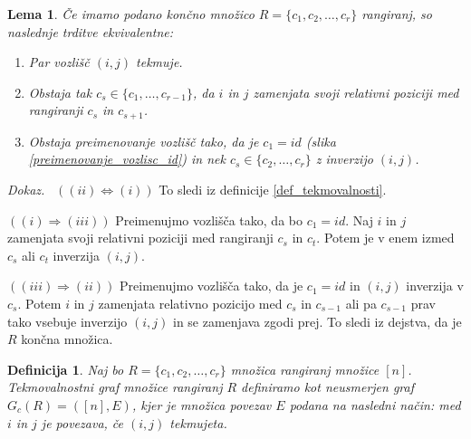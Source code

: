 \documentclass[a4paper, 12pt]{book}
\newtheorem{definicija}{Definicija}[chapter]
\newtheorem{lema}{Lema}[chapter]
\newenvironment{dokaz}{\emph{Dokaz.}\ }{\hspace{\fill}{$\Box$}}
\begin{document}
\begin{lema}
    Če imamo podano končno množico $R = \{ c_1, c_2, \dots, c_r \}$ rangiranj, so naslednje trditve ekvivalentne:
    \begin{enumerate}[label=(\roman*)]
        \item Par vozlišč $(i, j)$ tekmuje.
        \item Obstaja tak $c_s \in \{ c_1, \dots, c_{r-1} \}$, da $i$ in $j$ zamenjata svoji relativni poziciji med rangiranji $c_s$ in $c_{s+1}$.
        \item Obstaja preimenovanje vozlišč tako, da je $c_1 = id$ (slika \ref{preimenovanje_vozlisc_id}) in nek $c_s \in \{c_2, \dots, c_r\}$ z inverzijo $(i, j)$.
    \end{enumerate}
\end{lema}
\begin{dokaz}
    $((ii) \Leftrightarrow (i))$ To sledi iz definicije \ref{def_tekmovalnosti}. 
    
    $((i) \Rightarrow (iii))$ Preimenujmo vozlišča tako, da bo $c_1 = id$. Naj $i$ in $j$ zamenjata svoji relativni poziciji med rangiranji $c_s$ in $c_t$. Potem je v enem izmed $c_s$ ali $c_t$ inverzija $(i, j)$. 
    
    $((iii) \Rightarrow (ii))$ Preimenujmo vozlišča tako, da je $c_1 = id$ in $(i, j)$ inverzija v $c_s$. Potem $i$ in $j$ zamenjata relativno pozicijo med $c_s$ in $c_{s-1}$ ali pa $c_{s-1}$ prav tako vsebuje inverzijo $(i, j)$ in se zamenjava zgodi prej. To sledi iz dejstva, da je $R$ končna množica.
\end{dokaz}

\begin{definicija}
    Naj bo $R = \{ c_1, c_2, \dots, c_r \}$ množica rangiranj množice $[n]$. Tekmovalnostni graf množice rangiranj $R$ definiramo kot neusmerjen graf $G_c(R) = ([n], E)$, kjer je množica povezav $E$ podana na nasledni način: med $i$ in $j$ je povezava, če $(i, j)$ tekmujeta.
\end{definicija}
\end{document}
